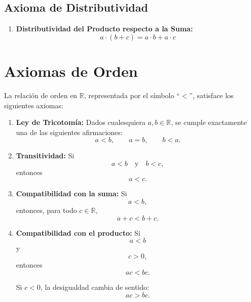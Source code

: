 \subsection{Axioma de Distributividad}
\begin{enumerate}[label=\textbf{D.\arabic*}]
    \item \textbf{Distributividad del Producto respecto a la Suma:} 
    \[
    a \cdot (b + c) = a \cdot b + a \cdot c
    \]
\end{enumerate}

\section{Axiomas de Orden}

La relación de orden en $\mathbb{R}$, representada por el símbolo ``$<$'', satisface los siguientes axiomas:

\begin{enumerate}[label=\textbf{O.\arabic*}]
    \item \textbf{Ley de Tricotomía:} Dados cualesquiera $a,b\in\mathbb{R}$, se cumple exactamente una de las siguientes afirmaciones:
    \[
    a<b,\qquad a=b,\qquad b<a.
    \]

    \item \textbf{Transitividad:} Si
    \[
    a<b \quad \text{y} \quad b<c,
    \]
    entonces
    \[
    a<c.
    \]

    \item \textbf{Compatibilidad con la suma:} Si
    \[
    a<b,
    \]
    entonces, para todo $c\in\mathbb{R}$,
    \[
    a+c<b+c.
    \]

    \item \textbf{Compatibilidad con el producto:} Si
    \[
    a<b
    \]
    y
    \[
    c>0,
    \]
    entonces
    \[
    ac<bc.
    \]

    Si $c<0$, la desigualdad cambia de sentido:
    \[
    ac>bc.
    \]
\end{enumerate}



